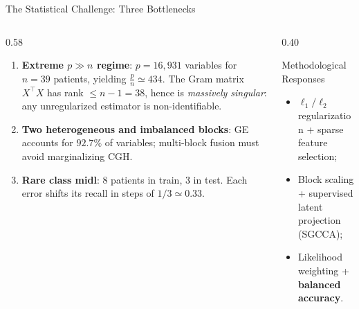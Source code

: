 \documentclass[aspectratio=169, 10pt]{beamer}
\begin{document}
\begin{frame}{The Statistical Challenge: Three Bottlenecks}
  \begin{columns}[T]
    \begin{column}{0.58\textwidth}
      \begin{enumerate}
        \item \textbf{Extreme $p \gg n$ regime}: $p = 16{,}931$ variables for $n = 39$ patients, yielding $\frac{p}{n} \simeq 434$. The Gram matrix $X^\top X$ has rank $\le n - 1 = 38$, hence is \emph{massively singular}: any unregularized estimator is non-identifiable.
        \item \textbf{Two heterogeneous and imbalanced blocks}: GE accounts for $92.7\%$ of variables; multi-block fusion must avoid marginalizing CGH.
        \item \textbf{Rare class midl}: 8 patients in train, 3 in test. Each error shifts its recall in steps of $1/3 \simeq 0.33$.
      \end{enumerate}
    \end{column}

    \begin{column}{0.40\textwidth}
      \begin{block}{Methodological Responses}
        \begin{itemize}
          \item $\ell_1 / \ell_2$ regularization + sparse feature selection;
          \item Block scaling + supervised latent projection (SGCCA);
          \item Likelihood weighting + \textbf{balanced accuracy}.
        \end{itemize}
      \end{block}
    \end{column}
  \end{columns}

  \vfill
  \begin{center}
  \end{center}
\end{frame}
\end{document}
